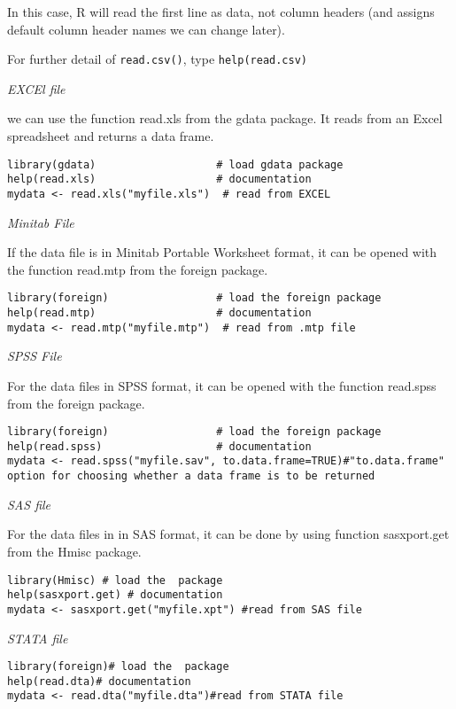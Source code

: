 \documentclass[]{book}
\theoremstyle{definition}
\theoremstyle{definition}
\theoremstyle{definition}
\theoremstyle{remark}
\begin{document}
In this case, R will read the first line as data, not column headers
(and assigns default column header names we can change later).

For further detail of \texttt{read.csv()}, type \texttt{help(read.csv)}

\emph{EXCEl file}

we can use the function read.xls from the gdata package. It reads from
an Excel spreadsheet and returns a data frame.

\begin{verbatim}
library(gdata)                   # load gdata package 
help(read.xls)                   # documentation 
mydata <- read.xls("myfile.xls")  # read from EXCEL
\end{verbatim}

\emph{Minitab File}

If the data file is in Minitab Portable Worksheet format, it can be
opened with the function read.mtp from the foreign package.

\begin{verbatim}
library(foreign)                 # load the foreign package 
help(read.mtp)                   # documentation 
mydata <- read.mtp("myfile.mtp")  # read from .mtp file
\end{verbatim}

\emph{SPSS File}

For the data files in SPSS format, it can be opened with the function
read.spss from the foreign package.

\begin{verbatim}
library(foreign)                 # load the foreign package 
help(read.spss)                  # documentation 
mydata <- read.spss("myfile.sav", to.data.frame=TRUE)#"to.data.frame" option for choosing whether a data frame is to be returned
\end{verbatim}

\emph{SAS file}

For the data files in in SAS format, it can be done by using function
sasxport.get from the Hmisc package.

\begin{verbatim}
library(Hmisc) # load the  package 
help(sasxport.get) # documentation 
mydata <- sasxport.get("myfile.xpt") #read from SAS file
\end{verbatim}

\emph{STATA file}

\begin{verbatim}
library(foreign)# load the  package 
help(read.dta)# documentation
mydata <- read.dta("myfile.dta")#read from STATA file
\end{verbatim}
\end{document}

